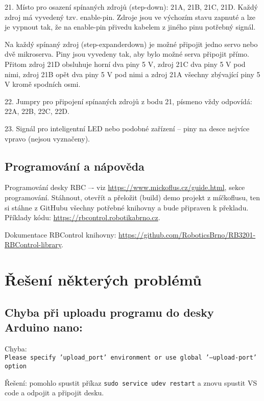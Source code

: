 21. Místo pro osazení spínaných zdrojů (step-down): 21A, 21B, 21C, 21D.
Každý zdroj má vyvedený tzv. enable-pin. Zdroje jsou ve výchozím stavu
zapnuté a lze je vypnout tak, že na enable-pin přivedu kabelem z jiného pinu
potřebný signál.

Na každý spínaný zdroj (step-expanderdown) je možné připojit jedno servo
nebo dvě mikroserva. Piny jsou vyvedeny tak, aby bylo možné serva připojit
přímo. Přitom zdroj 21D obsluhuje horní dva piny 5 V, zdroj 21C dva piny
5 V pod nimi, zdroj 21B opět dva piny 5 V pod nimi a zdroj 21A všechny
zbývající piny 5 V kromě spodních osmi.

22. Jumpry pro připojení spínaných zdrojů z bodu 21, písmeno vždy odpovídá: 22A, 22B, 22C, 22D.

23. Signál pro inteligentní LED nebo podobné zařízení -- piny na desce nejvíce vpravo (nejsou vyznačeny).

\subsection{Programování a nápověda}
Programování desky RBC –-
viz \url{https://www.mickoflus.cz/guide.html}, sekce programování. Stáhnout,
otevřít a přeložit (build) demo projekt z míčkoflusu, ten si stáhne z GitHubu
všechny potřebné knihovny a bude připraven k překladu.
Příklady kódu: \url{https://rbcontrol.robotikabrno.cz}.

Dokumentace RBControl knihovny: \url{https://github.com/RoboticsBrno/RB3201-RBControl-library}.

\section{Řešení některých problémů}

\subsection{Chyba při uploadu programu do desky Arduino nano:}
 
 Chyba: \\
 {\tt  Please specify 'upload\_port' environment or use global '--upload-port' option}
 
 Řešení: pomohlo spustit příkaz {\tt sudo service udev restart} a znovu spustit VS code a odpojit a připojit desku.  


